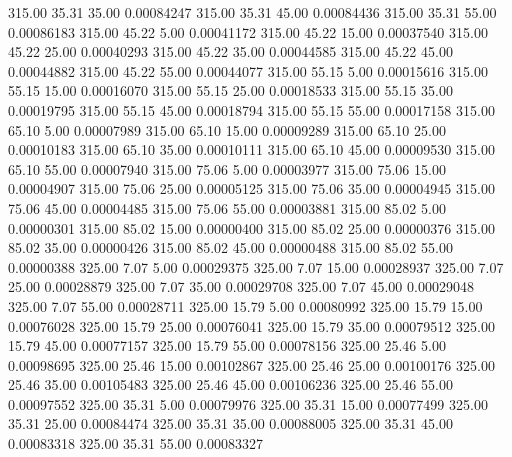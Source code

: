     315.00     35.31     35.00     0.00084247
    315.00     35.31     45.00     0.00084436
    315.00     35.31     55.00     0.00086183
    315.00     45.22      5.00     0.00041172
    315.00     45.22     15.00     0.00037540
    315.00     45.22     25.00     0.00040293
    315.00     45.22     35.00     0.00044585
    315.00     45.22     45.00     0.00044882
    315.00     45.22     55.00     0.00044077
    315.00     55.15      5.00     0.00015616
    315.00     55.15     15.00     0.00016070
    315.00     55.15     25.00     0.00018533
    315.00     55.15     35.00     0.00019795
    315.00     55.15     45.00     0.00018794
    315.00     55.15     55.00     0.00017158
    315.00     65.10      5.00     0.00007989
    315.00     65.10     15.00     0.00009289
    315.00     65.10     25.00     0.00010183
    315.00     65.10     35.00     0.00010111
    315.00     65.10     45.00     0.00009530
    315.00     65.10     55.00     0.00007940
    315.00     75.06      5.00     0.00003977
    315.00     75.06     15.00     0.00004907
    315.00     75.06     25.00     0.00005125
    315.00     75.06     35.00     0.00004945
    315.00     75.06     45.00     0.00004485
    315.00     75.06     55.00     0.00003881
    315.00     85.02      5.00     0.00000301
    315.00     85.02     15.00     0.00000400
    315.00     85.02     25.00     0.00000376
    315.00     85.02     35.00     0.00000426
    315.00     85.02     45.00     0.00000488
    315.00     85.02     55.00     0.00000388
    325.00      7.07      5.00     0.00029375
    325.00      7.07     15.00     0.00028937
    325.00      7.07     25.00     0.00028879
    325.00      7.07     35.00     0.00029708
    325.00      7.07     45.00     0.00029048
    325.00      7.07     55.00     0.00028711
    325.00     15.79      5.00     0.00080992
    325.00     15.79     15.00     0.00076028
    325.00     15.79     25.00     0.00076041
    325.00     15.79     35.00     0.00079512
    325.00     15.79     45.00     0.00077157
    325.00     15.79     55.00     0.00078156
    325.00     25.46      5.00     0.00098695
    325.00     25.46     15.00     0.00102867
    325.00     25.46     25.00     0.00100176
    325.00     25.46     35.00     0.00105483
    325.00     25.46     45.00     0.00106236
    325.00     25.46     55.00     0.00097552
    325.00     35.31      5.00     0.00079976
    325.00     35.31     15.00     0.00077499
    325.00     35.31     25.00     0.00084474
    325.00     35.31     35.00     0.00088005
    325.00     35.31     45.00     0.00083318
    325.00     35.31     55.00     0.00083327
